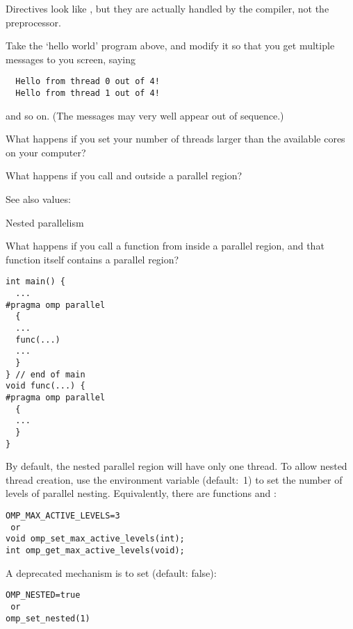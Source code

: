 Directives look like , but they
are actually handled by the compiler, not the preprocessor.

\begin{exercise}
  Take the `hello world' program above, and modify it so that you get
  multiple messages to you screen, saying
\begin{verbatim}
  Hello from thread 0 out of 4!
  Hello from thread 1 out of 4!
\end{verbatim}
  and so on. (The messages may very well appear out of sequence.)


  What happens if you set your number of threads larger than the available
  cores on your computer?
\end{exercise}

\begin{exercise}
  What happens if you call  and 
  outside a parallel region?
\end{exercise}

See also  values: 

 {Nested parallelism}
\label{sec:omp-levels}

What happens if you call a function from inside a parallel region, and
that function itself contains a parallel region?
\begin{lstlisting}
int main() {
  ...
#pragma omp parallel
  {
  ...
  func(...)
  ...
  }
} // end of main
void func(...) {
#pragma omp parallel
  {
  ...
  }
}
\end{lstlisting}

By default, the nested parallel region will have only one thread.
To allow nested thread creation,
use the environment variable
 (default:~1)
to set the number of levels of parallel nesting.
Equivalently, there are functions
 and :
\begin{verbatim}
OMP_MAX_ACTIVE_LEVELS=3
 or
void omp_set_max_active_levels(int);
int omp_get_max_active_levels(void);
\end{verbatim}

\begin{remark}
  A deprecated mechanism is to
  set  (default: false):
\begin{verbatim}
OMP_NESTED=true
 or
omp_set_nested(1)
\end{verbatim}
\end{remark}

